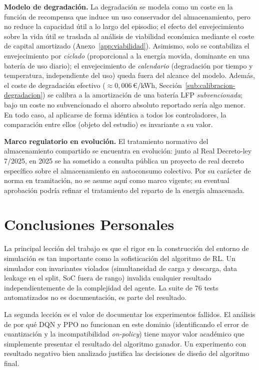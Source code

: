 \documentclass[12pt, a4paper, twoside]{report}
\begin{document}
\textbf{Modelo de degradación.} La degradación se modela como un coste en la
función de recompensa que induce un uso conservador del almacenamiento, pero no
reduce la capacidad útil a lo largo del episodio; el efecto del envejecimiento
sobre la vida útil se traslada al análisis de viabilidad económica mediante el
coste de capital amortizado (Anexo~\ref{app:viabilidad}). Asimismo, solo se
contabiliza el envejecimiento por \emph{ciclado} (proporcional a la energía
movida, dominante en una batería de uso diario); el envejecimiento de
\emph{calendario} (degradación por tiempo y temperatura, independiente del uso)
queda fuera del alcance del modelo. Además, el coste de
degradación efectivo ($\approx0{,}006$\,€/kWh, Sección~\ref{sub:calibracion-degradacion})
se calibra a la amortización de una batería LFP \emph{subvencionada}; bajo un
coste no subvencionado el ahorro absoluto reportado sería algo menor. En todo
caso, al aplicarse de forma idéntica a todos los controladores, la comparación
entre ellos (objeto del estudio) es invariante a su valor.

\textbf{Marco regulatorio en evolución.} El tratamiento normativo del
almacenamiento compartido se encuentra en evolución: junto al Real Decreto-ley
7/2025, en 2025 se ha sometido a consulta pública un proyecto de real decreto
específico sobre el almacenamiento en autoconsumo colectivo. Por su carácter de
norma en tramitación, no se asume aquí como marco vigente; su eventual aprobación
podría refinar el tratamiento del reparto de la energía
almacenada.

\section{Conclusiones Personales}

La principal lección del trabajo es que el rigor en la construcción del entorno
de simulación es tan importante como la sofisticación del algoritmo de RL. Un
simulador con invariantes violados (simultaneidad de carga y descarga, data
leakage en el split, SoC fuera de rango) invalida cualquier resultado
independientemente de la complejidad del agente. La suite de 76 tests
automatizados no es documentación, es parte del resultado.

La segunda lección es el valor de documentar los experimentos fallidos. El
análisis de por qué DQN y PPO no funcionan en este dominio (identificando el
error de cuantización y la incompatibilidad \textit{on-policy}) tiene mayor
valor académico que simplemente presentar el resultado del algoritmo ganador.
Un experimento con resultado negativo bien analizado justifica las decisiones
de diseño del algoritmo final.
\end{document}
